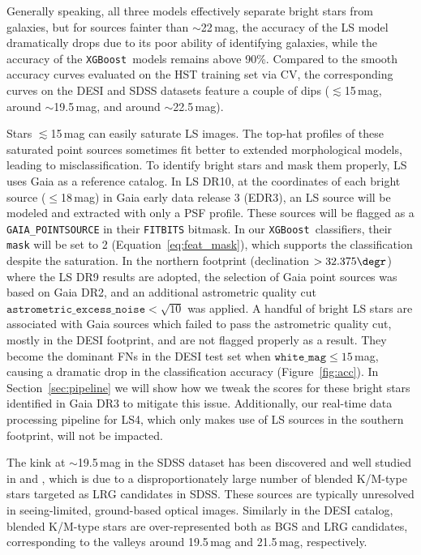 \documentclass[twocolumn,tighten]{aastex631}
\newcommand{\xgboost}{\texttt{XGBoost}}
\newcommand{\dr}[1]{DR{#1}}
\begin{document}
\begin{CJK*}{UTF8}{gbsn}
Generally speaking, all three models effectively separate bright stars from galaxies, but for sources fainter than $\sim$22\,mag, the accuracy of the LS model dramatically drops due to its poor ability of identifying galaxies, while the accuracy of the \xgboost\ models remains above 90\%. Compared to the smooth accuracy curves evaluated on the HST training set via CV, the corresponding curves on the DESI and SDSS datasets feature a couple of dips ($\lesssim$15\,mag, around $\sim$19.5\,mag, and around $\sim$22.5\,mag). 

Stars $\lesssim$15\,mag can easily saturate LS images. The top-hat profiles of these saturated point sources sometimes fit better to extended morphological models, leading to misclassification. To identify bright stars and mask them properly, LS uses Gaia as a reference catalog. In LS \dr{10}, at the coordinates of each bright source ($\le$18\,mag) in Gaia early data release 3 (E\dr{3}), an LS source will be modeled and extracted with only a PSF profile. These sources will be flagged as a \texttt{GAIA\_POINTSOURCE} in their \texttt{FITBITS} bitmask. In our \xgboost\ classifiers, their \texttt{mask} will be set to 2 (Equation~\ref{eq:feat_mask}), which supports the classification despite the saturation. In the northern footprint (declination $>32.375\degr$) where the LS \dr{9} results are adopted, the selection of Gaia point sources was based on Gaia \dr{2}, and an additional astrometric quality cut $\texttt{astrometric\_excess\_noise}<\sqrt{10}$ was applied. A handful of bright LS stars are associated with Gaia sources which failed to pass the astrometric quality cut, mostly in the DESI footprint, and are not flagged properly as a result. They become the dominant FNs in the DESI test set when $\texttt{white\_mag} \le 15$\,mag, causing a dramatic drop in the classification accuracy (Figure~\ref{fig:acc}). In Section~\ref{sec:pipeline} we will show how we tweak the scores for these bright stars identified in Gaia \dr{3} to mitigate this issue. Additionally, our real-time data processing pipeline for LS4, which only makes use of LS sources in the southern footprint, will not be impacted. 

The kink at $\sim$19.5\,mag in the SDSS dataset has been discovered and well studied in \cite{Miller_2017} and , which is due to a disproportionately large number of blended K/M-type stars targeted as LRG candidates in SDSS. These sources are typically unresolved in seeing-limited, ground-based optical images. Similarly in the DESI catalog, blended K/M-type stars are over-represented both as BGS \citep[bright galaxy survey;][]{DESI_BGS_2023} and LRG candidates, corresponding to the valleys around 19.5\,mag and 21.5\,mag, respectively.


\end{CJK*}
\end{document}
